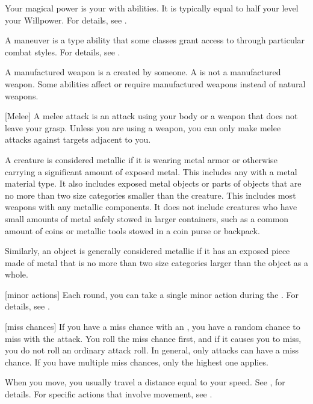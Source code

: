  Your magical power is your  with \magical abilities.
It is typically equal to half your level \add your Willpower.
For details, see .

 A maneuver is a type  ability that some classes grant access to through particular combat styles.
For details, see .

 A manufactured weapon is a  created by someone.
A  is not a manufactured weapon. 
Some abilities affect or require manufactured weapons instead of natural weapons.

[Melee] A melee attack is an attack using your body or a weapon that does not leave your grasp.
Unless you are using a  weapon, you can only make melee attacks against targets adjacent to you.

 A creature is considered metallic if it is wearing metal armor or otherwise carrying a significant amount of exposed metal.
This includes any  with a metal material type.
It also includes exposed metal objects or parts of objects that are no more than two size categories smaller than the creature.
This includes most weapons with any metallic components.
It does not include creatures who have small amounts of metal safely stowed in larger containers, such as a common amount of coins or metallic tools stowed in a coin purse or backpack.

Similarly, an object is generally considered metallic if it has an exposed piece made of metal that is no more than two size categories larger than the object as a whole.

[minor actions] Each round, you can take a single minor action during the .
For details, see .

[miss chances] If you have a miss chance with an , you have a random chance to miss with the attack.
You roll the miss chance first, and if it causes you to miss, you do not roll an ordinary attack roll.
In general, only  attacks can have a miss chance.
If you have multiple miss chances, only the highest one applies.

 When you move, you usually travel a distance equal to your speed.
See , for details.
For specific actions that involve movement, see .

